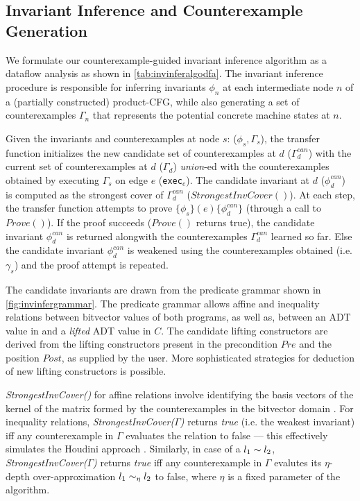 


\subsection{Invariant Inference and Counterexample Generation}
\label{sec:invinferalgo}
We formulate our counterexample-guided invariant inference algorithm as a dataflow analysis
as shown in \cref{tab:invinferalgodfa}.
The invariant inference procedure is responsible for inferring invariants $\phi_n$ at each intermediate
node $n$ of a (partially constructed) product-CFG, while also generating a set of counterexamples
$\Gamma_n$ that represents the potential concrete machine states at $n$.

Given the invariants and counterexamples at node $s$: ($\phi_s,\Gamma_s$),
the transfer function initializes the new candidate set of counterexamples at $d$ ($\Gamma^{can}_{d}$)
with the current set of counterexamples at $d$ ($\Gamma_{d}$) {\em union}-ed with
the counterexamples obtained by executing $\Gamma_s$ on edge $e$ ({\tt exec}$_e$).
The candidate invariant at $d$ ($\phi^{can}_d$) is computed as the strongest cover
of $\Gamma^{can}_{d}$ ($StrongestInvCover()$).
At each step, the transfer function attempts to prove $\{\phi_s\} (e) \{\phi^{can}_d\}$
(through a call to $Prove()$).
If the proof succeeds ($Prove()$ returns true), the candidate invariant $\phi^{can}_d$ is returned alongwith
the counterexamples $\Gamma^{can}_d$ learned so far.
Else the candidate invariant $\phi^{can}_d$ is weakened using the counterexamples obtained
(i.e. $\gamma_s$) and the proof attempt is repeated.

The candidate invariants are drawn from the predicate grammar shown in \cref{fig:invinfergrammar}.
The predicate grammar allows affine and inequality relations between bitvector values of both
programs, as well as, \recursiveRelations{} between an ADT value in \SpecL{} and a {\em lifted} ADT value in $C$.
The candidate lifting constructors are derived from the lifting constructors
present in the precondition $Pre$ and the position $Post$, as supplied by the user.
More sophisticated strategies for deduction of new lifting constructors is possible.

{\em StrongestInvCover()} for affine relations involve
identifying the basis vectors of the kernel of the
matrix formed by the counterexamples in the bitvector
domain \cite{esop05,semalign}.
For inequality relations, {\em StrongestInvCover($\Gamma$)}
returns {\em true} (i.e. the weakest invariant) iff any counterexample in $\Gamma$ evaluates the
relation to false --- this effectively simulates the Houdini approach \cite{houdini}.
Similarly, in case of a \recursiveRelation{} $l_1 \sim{} l_2$, {\em StrongestInvCover($\Gamma$)}
returns {\em true} iff any counterexample in $\Gamma$ evalutes its $\eta$-depth over-approximation
$l_1 \sim_\eta l_2$ to false, where $\eta$ is a fixed parameter of the algorithm.

